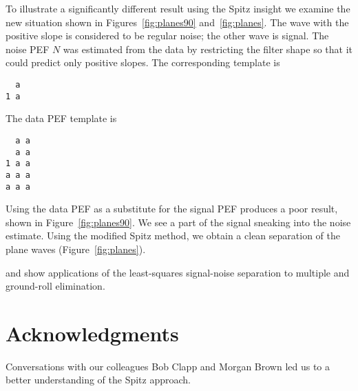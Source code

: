 \par
To illustrate a significantly different result
using the Spitz insight we examine the new situation shown in
Figures~\ref{fig:planes90} and~\ref{fig:planes}.
The wave with the positive slope is considered to be
regular noise;
the other wave is signal.
The noise PEF $N$ was
estimated from the data by restricting the filter shape so that it
could predict only positive slopes. The corresponding template is
\begin{verbatim}
  a 
1 a 
\end{verbatim}
The data PEF template is
\begin{verbatim}
  a a
  a a
1 a a
a a a
a a a
\end{verbatim}
Using the data PEF as a substitute for the signal PEF produces a poor
result, shown in Figure~\ref{fig:planes90}.  We see a part of the
signal sneaking into the noise estimate. Using the modified Spitz
method, we obtain a clean separation of the plane waves
(Figure~\ref{fig:planes}).


 
\cite{Clapp.sep.102.bob2,Clapp.sep.103.bob2} and
\cite{Brown.sep.102.morgan1} show applications of the
least-squares signal-noise separation to multiple and ground-roll
elimination.

\section{Acknowledgments}

Conversations with our colleagues Bob Clapp and Morgan Brown led us to
a better understanding of the Spitz approach.





